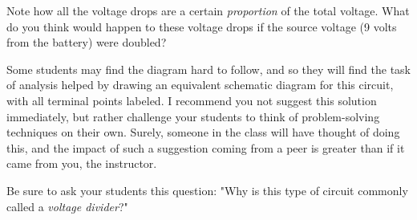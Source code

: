 Note how all the voltage drops are a certain {\it proportion} of the total voltage.  What do you think would happen to these voltage drops if the source voltage (9 volts from the battery) were doubled?







Some students may find the diagram hard to follow, and so they will find the task of analysis helped by drawing an equivalent schematic diagram for this circuit, with all terminal points labeled.  I recommend you not suggest this solution immediately, but rather challenge your students to think of problem-solving techniques on their own.  Surely, someone in the class will have thought of doing this, and the impact of such a suggestion coming from a peer is greater than if it came from you, the instructor.

Be sure to ask your students this question: "Why is this type of circuit commonly called a {\it voltage divider}?"




